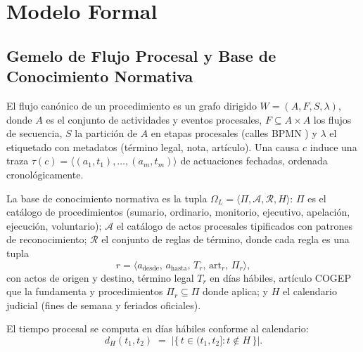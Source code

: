 \documentclass[computers,article,submit,pdftex,moreauthors]{Definitions/mdpi}
\begin{document}
\section{Modelo Formal}
\label{sec:formal}

\subsection{Gemelo de Flujo Procesal y Base de Conocimiento Normativa}

\begin{Definition}
El flujo canónico de un procedimiento es un grafo dirigido $W = (A, F, S, \lambda)$, donde $A$ es el conjunto de actividades y eventos procesales, $F \subseteq A \times A$ los flujos de secuencia, $S$ la partición de $A$ en etapas procesales (calles BPMN \cite{Chinosi2012}) y $\lambda$ el etiquetado con metadatos (término legal, nota, artículo). Una causa $c$ induce una traza $\tau(c) = \langle (a_1, t_1), \dots, (a_m, t_m) \rangle$ de actuaciones fechadas, ordenada cronológicamente.
\end{Definition}

\begin{Definition}
La base de conocimiento normativa es la tupla $\Omega_{L} = \langle \Pi, \mathcal{A}, \mathcal{R}, H \rangle$: $\Pi$ es el catálogo de procedimientos (sumario, ordinario, monitorio, ejecutivo, apelación, ejecución, voluntario); $\mathcal{A}$ el catálogo de actos procesales tipificados con patrones de reconocimiento; $\mathcal{R}$ el conjunto de reglas de término, donde cada regla es una tupla
\begin{equation}
r = \langle a_{\mathrm{desde}},\, a_{\mathrm{hasta}},\, T_r,\, \mathrm{art}_r,\, \Pi_r \rangle,
\label{eq:regla}
\end{equation}
con actos de origen y destino, término legal $T_r$ en días hábiles, artículo COGEP que la fundamenta y procedimientos $\Pi_r \subseteq \Pi$ donde aplica; y $H$ el calendario judicial (fines de semana y feriados oficiales).
\end{Definition}

El tiempo procesal se computa en días hábiles conforme al calendario:
\begin{equation}
d_H(t_1, t_2) \;=\; \bigl|\{\, t \in (t_1, t_2] : t \notin H \,\}\bigr|.
\label{eq:habiles}
\end{equation}
\end{document}
